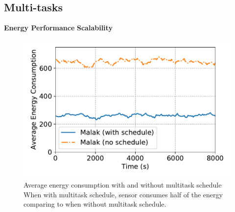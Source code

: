 \subsection{Multi-tasks}
\textbf{Energy Performance}
\textbf{Scalability}
\begin{figure}[htbp]
	\centering
	\includegraphics[width=.85\columnwidth]{Figure/multitask_energy}
	\vspace{-0.1in}
	\caption{Average energy consumption with and without multitask schedule
		\textnormal{When with multitask schedule, sensor consumes half of the energy
			comparing to when without multitask schedule.}}
	\label{fig:multitask_energy}
\end{figure}
